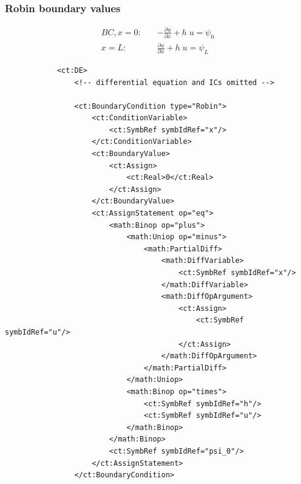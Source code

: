 \subsubsection*{Robin boundary values}

\begin{align}
BC, x=0: \quad & -\frac{\partial u}{\partial x} + h\; u  = \psi_0 \nonumber \\
	x=L: \quad & \frac{\partial u}{\partial x} + h\; u = \psi_L \nonumber
\end{align}

\lstset{language=XML}
\begin{lstlisting}
            <ct:DE>
                <!-- differential equation and ICs omitted -->
                
                <ct:BoundaryCondition type="Robin">
                    <ct:ConditionVariable>
                        <ct:SymbRef symbIdRef="x"/>
                    </ct:ConditionVariable>
                    <ct:BoundaryValue>
                        <ct:Assign>
                            <ct:Real>0</ct:Real>
                        </ct:Assign>
                    </ct:BoundaryValue>
                    <ct:AssignStatement op="eq">
                        <math:Binop op="plus">
                            <math:Uniop op="minus">
                                <math:PartialDiff>
                                    <math:DiffVariable>
                                        <ct:SymbRef symbIdRef="x"/>
                                    </math:DiffVariable>
                                    <math:DiffOpArgument>
                                        <ct:Assign>
                                            <ct:SymbRef symbIdRef="u"/>
                                        </ct:Assign>
                                    </math:DiffOpArgument>
                                </math:PartialDiff>
                            </math:Uniop>
                            <math:Binop op="times">
                                <ct:SymbRef symbIdRef="h"/>
                                <ct:SymbRef symbIdRef="u"/>
                            </math:Binop>
                        </math:Binop>
                        <ct:SymbRef symbIdRef="psi_0"/>
                    </ct:AssignStatement>
                </ct:BoundaryCondition>
                

\end{lstlisting}
